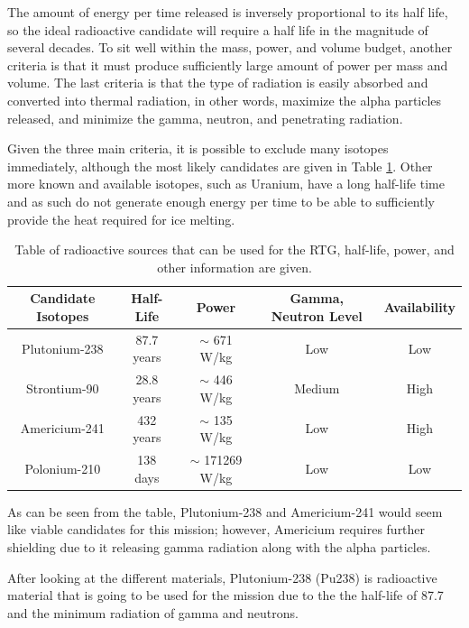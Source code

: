 The amount of energy per time released is inversely proportional to its half life, so the ideal radioactive candidate will require a half life in the magnitude of several decades. To sit well within the mass, power, and volume budget, another criteria is that it must produce sufficiently large amount of power per mass and volume. The last criteria is that the type of radiation is easily absorbed and converted into thermal radiation, in other words, maximize the alpha particles released, and minimize the gamma, neutron, and penetrating radiation.

Given the three main criteria, it is possible to exclude many isotopes immediately, although the most likely candidates are given in Table \ref{tab:isotopes}. Other more known and available isotopes, such as Uranium, have a long half-life time and as such do not generate enough energy per time to be able to sufficiently provide the heat required for ice melting.

\begin{table}[h!]
	\begin{tabular}{c|c|c|c|c}
		Candidate Isotopes & Half-Life & Power & Gamma, Neutron Level & Availability\\
		\hline
		Plutonium-238 & 87.7 years & $\sim$ 671 W/kg & Low & Low\\
		Strontium-90 & 28.8 years & $\sim$ 446 W/kg & Medium & High\\
		Americium-241 & 432 years & $\sim$ 135 W/kg & Low & High\\
		Polonium-210 & 138 days & $\sim$ 171269 W/kg & Low & Low\\
	\end{tabular}
	\caption{Table of radioactive sources that can be used for the RTG, half-life, power, and other information are given. \label{tab:isotopes}}
\end{table}

As can be seen from the table, Plutonium-238 and Americium-241 would seem like viable candidates for this mission; however, Americium requires further shielding due to it releasing gamma radiation along with the alpha particles.

After looking at the different materials, Plutonium-238 (Pu238) is radioactive material that is going to be used for the mission due to the the half-life of 87.7 and the minimum radiation of gamma and neutrons. 

